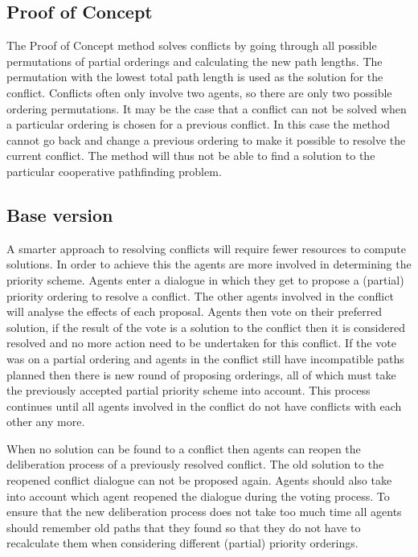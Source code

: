 \documentclass[a4paper]{article}
\begin{document}
\subsection{Proof of Concept}
The Proof of Concept method solves conflicts by going through all possible 
permutations of partial orderings and calculating the new path lengths. The permutation 
with the lowest total path length is used as the solution for the conflict. 
Conflicts often only involve two agents, so there are only two possible 
ordering permutations. It may be the case that a conflict can not be solved 
when a particular ordering is chosen for a previous conflict. In this case the 
method cannot go back and change a previous ordering to make it possible to 
resolve the current conflict. The method will thus not be able to find a 
solution to the particular cooperative pathfinding problem.

\subsection{Base version}
A smarter approach to resolving conflicts will require fewer resources to 
compute solutions. In order to achieve this the agents are more involved in 
determining the priority scheme. Agents enter a dialogue in which they get to 
propose a (partial) priority 
ordering to resolve a conflict. The other agents involved in the conflict will 
analyse the effects of each proposal. Agents then vote on their preferred 
solution, if the result of the vote is a solution to the conflict then it is 
considered resolved and no more action need to be undertaken for this conflict. 
If the vote was on a partial ordering and agents in the conflict still have 
incompatible paths planned then there is  new round of proposing orderings, all 
of which must take the previously accepted partial priority scheme into 
account. This process continues until all agents involved in the conflict do 
not have conflicts with each other any more.

When no solution can be found to a conflict then agents can reopen the 
deliberation process of a previously resolved conflict. The old solution to the 
reopened conflict dialogue can not be proposed again. Agents should also take 
into account which agent reopened the dialogue during the voting process. To 
ensure that the new deliberation process does not take too much time all agents 
should remember old paths that they found so that they do not have to 
recalculate them when considering different (partial) priority orderings.
\end{document}
